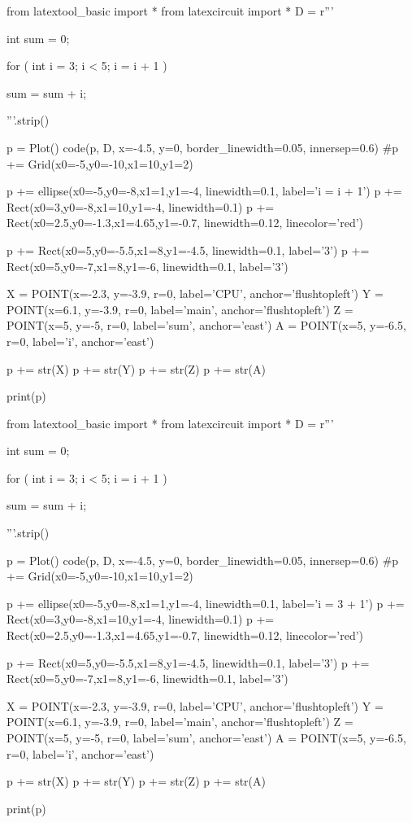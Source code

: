 \begin{python}
from latextool_basic import *
from latexcircuit import *
D = r'''



int sum = 0;

    for ( int i = 3;     i < 5;     i = i + 1 )


        sum = sum + i;



'''.strip()

p = Plot()
code(p, D, x=-4.5, y=0, border_linewidth=0.05, innersep=0.6)
#p += Grid(x0=-5,y0=-10,x1=10,y1=2)

p += ellipse(x0=-5,y0=-8,x1=1,y1=-4, linewidth=0.1, label='i = i + 1')
p += Rect(x0=3,y0=-8,x1=10,y1=-4, linewidth=0.1)
p += Rect(x0=2.5,y0=-1.3,x1=4.65,y1=-0.7, linewidth=0.12, linecolor='red')

p += Rect(x0=5,y0=-5.5,x1=8,y1=-4.5, linewidth=0.1, label='3')
p += Rect(x0=5,y0=-7,x1=8,y1=-6, linewidth=0.1, label='3')

X = POINT(x=-2.3, y=-3.9, r=0, label='CPU', anchor='flushtopleft')
Y = POINT(x=6.1, y=-3.9, r=0, label='main', anchor='flushtopleft')
Z = POINT(x=5, y=-5, r=0, label='sum', anchor='east')
A = POINT(x=5, y=-6.5, r=0, label='i', anchor='east')

p += str(X)
p += str(Y)
p += str(Z)
p += str(A)

print(p)
\end{python}

\begin{python}
from latextool_basic import *
from latexcircuit import *
D = r'''



int sum = 0;

    for ( int i = 3;     i < 5;     i = i + 1 )


        sum = sum + i;



'''.strip()

p = Plot()
code(p, D, x=-4.5, y=0, border_linewidth=0.05, innersep=0.6)
#p += Grid(x0=-5,y0=-10,x1=10,y1=2)

p += ellipse(x0=-5,y0=-8,x1=1,y1=-4, linewidth=0.1, label='i = 3 + 1')
p += Rect(x0=3,y0=-8,x1=10,y1=-4, linewidth=0.1)
p += Rect(x0=2.5,y0=-1.3,x1=4.65,y1=-0.7, linewidth=0.12, linecolor='red')

p += Rect(x0=5,y0=-5.5,x1=8,y1=-4.5, linewidth=0.1, label='3')
p += Rect(x0=5,y0=-7,x1=8,y1=-6, linewidth=0.1, label='3')

X = POINT(x=-2.3, y=-3.9, r=0, label='CPU', anchor='flushtopleft')
Y = POINT(x=6.1, y=-3.9, r=0, label='main', anchor='flushtopleft')
Z = POINT(x=5, y=-5, r=0, label='sum', anchor='east')
A = POINT(x=5, y=-6.5, r=0, label='i', anchor='east')

p += str(X)
p += str(Y)
p += str(Z)
p += str(A)

print(p)
\end{python}

